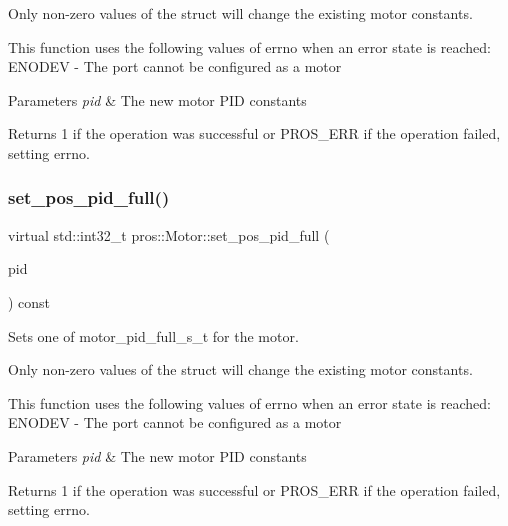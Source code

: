 Only non-\/zero values of the struct will change the existing motor constants.

This function uses the following values of errno when an error state is reached\+: E\+N\+O\+D\+EV -\/ The port cannot be configured as a motor


\begin{DoxyParams}{Parameters}
{\em pid} & The new motor P\+ID constants\\
\hline
\end{DoxyParams}
\begin{DoxyReturn}{Returns}
1 if the operation was successful or P\+R\+O\+S\+\_\+\+E\+RR if the operation failed, setting errno. 
\end{DoxyReturn}
\mbox{\label{classpros_1_1Motor_a67cff0666b34c3731e21e856414c2066}} 
\subsubsection{\texorpdfstring{set\+\_\+pos\+\_\+pid\+\_\+full()}{set\_pos\_pid\_full()}}
{\footnotesize\ttfamily virtual std\+::int32\+\_\+t pros\+::\+Motor\+::set\+\_\+pos\+\_\+pid\+\_\+full (\begin{DoxyParamCaption}\item[{const \hyperlink{motors_8h_a0295cbf49f5c70c17b5fa962bd25febd}{motor\+\_\+pid\+\_\+full\+\_\+s\+\_\+t}}]{pid }\end{DoxyParamCaption}) const\hspace{0.3cm}{\ttfamily [virtual]}}



Sets one of motor\+\_\+pid\+\_\+full\+\_\+s\+\_\+t for the motor. 

Only non-\/zero values of the struct will change the existing motor constants.

This function uses the following values of errno when an error state is reached\+: E\+N\+O\+D\+EV -\/ The port cannot be configured as a motor


\begin{DoxyParams}{Parameters}
{\em pid} & The new motor P\+ID constants\\
\hline
\end{DoxyParams}
\begin{DoxyReturn}{Returns}
1 if the operation was successful or P\+R\+O\+S\+\_\+\+E\+RR if the operation failed, setting errno. 
\end{DoxyReturn}
\mbox{\label{classpros_1_1Motor_a69169ae0cd2b7f68ee533648c7830397}} 
